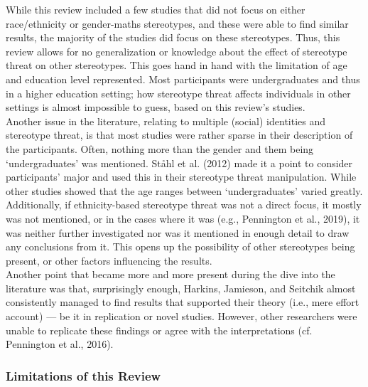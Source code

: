 \documentclass[
  stu, a4paper, 12pt,mask,floatsintext]{apa7}
\begin{document}
While this review included a few studies that did not focus on either race/ethnicity or gender-maths stereotypes, and these were able to find similar results, the majority of the studies did focus on these stereotypes.
Thus, this review allows for no generalization or knowledge about the effect of stereotype threat on other stereotypes.
This goes hand in hand with the limitation of age and education level represented. Most participants were undergraduates and thus in a higher education setting; how stereotype threat affects individuals in other settings is almost impossible to guess, based on this review's studies.\\
Another issue in the literature, relating to multiple (social) identities and stereotype threat, is that most studies were rather sparse in their description of the participants.
Often, nothing more than the gender and them being `undergraduates' was mentioned.
Ståhl et al. (2012) made it a point to consider participants' major and used this in their stereotype threat manipulation. While other studies showed that the age ranges between `undergraduates' varied greatly.
Additionally, if ethnicity-based stereotype threat was not a direct focus, it mostly was not mentioned, or in the cases where it was (e.g., Pennington et al., 2019), it was neither further investigated nor was it mentioned in enough detail to draw any conclusions from it.
This opens up the possibility of other stereotypes being present, or other factors influencing the results.\\
Another point that became more and more present during the dive into the literature was that, surprisingly enough, Harkins, Jamieson, and Seitchik almost consistently managed to find results that supported their theory (i.e., mere effort account) --- be it in replication or novel studies.
However, other researchers were unable to replicate these findings or agree with the interpretations (cf. Pennington et al., 2016).

\subsubsection{Limitations of this Review}\label{limitations-of-this-review}
\end{document}
